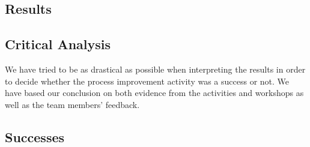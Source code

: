 \documentclass[11pt]{article}
\begin{document}
\subsection*{Results}

\par

\subsection*{Critical Analysis}

\par
We have tried to be as drastical as possible when interpreting the results in order to decide whether the process improvement activity was a success or not. We have based our conclusion on both evidence from the activities and workshops as well as the team members' feedback.

\subsection*{Successes}
\end{document}
